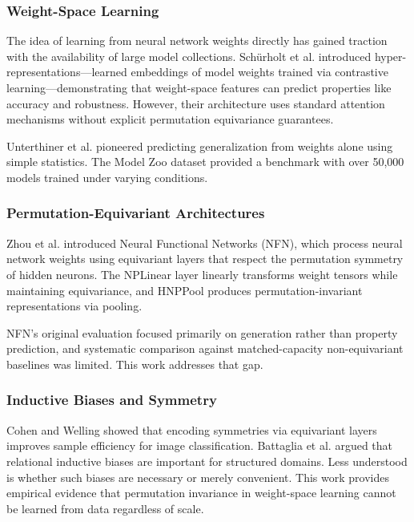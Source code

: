 
\subsubsection{Weight-Space Learning}

The idea of learning from neural network weights directly has gained traction with the availability of large model collections. Schürholt et al. introduced hyper-representations---learned embeddings of model weights trained via contrastive learning---demonstrating that weight-space features can predict properties like accuracy and robustness. However, their architecture uses standard attention mechanisms without explicit permutation equivariance guarantees.

Unterthiner et al. pioneered predicting generalization from weights alone using simple statistics. The Model Zoo dataset provided a benchmark with over 50,000 models trained under varying conditions.

\subsubsection{Permutation-Equivariant Architectures}

Zhou et al. introduced Neural Functional Networks (NFN), which process neural network weights using equivariant layers that respect the permutation symmetry of hidden neurons. The NPLinear layer linearly transforms weight tensors while maintaining equivariance, and HNPPool produces permutation-invariant representations via pooling.

NFN's original evaluation focused primarily on generation rather than property prediction, and systematic comparison against matched-capacity non-equivariant baselines was limited. This work addresses that gap.

\subsubsection{Inductive Biases and Symmetry}

Cohen and Welling showed that encoding symmetries via equivariant layers improves sample efficiency for image classification. Battaglia et al. argued that relational inductive biases are important for structured domains. Less understood is whether such biases are necessary or merely convenient. This work provides empirical evidence that permutation invariance in weight-space learning cannot be learned from data regardless of scale.


